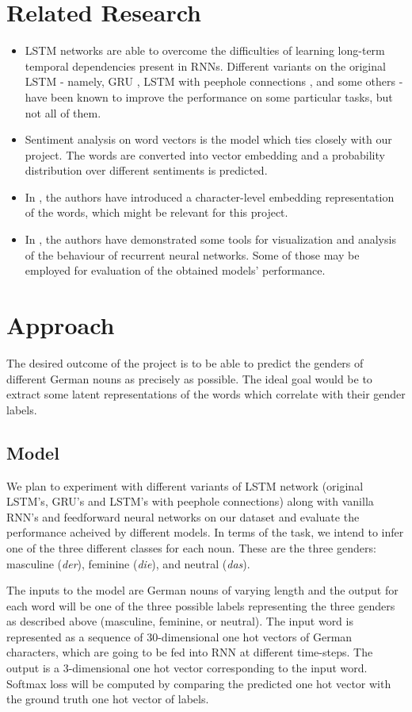 \documentclass[10pt,twocolumn,letterpaper]{article}
\begin{document}
\section{Related Research}
\begin{itemize}
    \item LSTM networks \cite{lstm} are able to overcome the difficulties of learning long-term temporal dependencies present in RNNs. Different variants on the original LSTM - namely, GRU \cite{gru}, LSTM with peephole connections \cite{peephole}, and some others - have been known to improve the performance on some particular tasks, but not all of them.
    \item Sentiment analysis on word vectors \cite{ng} is the model which ties closely with our project. The words are converted into vector embedding and a probability distribution over different sentiments is predicted.
    \item In \cite{santos}, the authors have introduced a character-level embedding representation of the words, which might be relevant for this project.
    \item In \cite{karpathy}, the authors have demonstrated some tools for visualization and analysis of the behaviour of recurrent neural networks. Some of those may be employed for evaluation of the obtained models' performance.
\end{itemize}

\section{Approach}
The desired outcome of the project is to be able to predict the genders of different German nouns as precisely as possible. The ideal goal would be to extract some latent representations of the words which correlate with their gender labels.\\

\subsection{Model}
We plan to experiment with different variants of LSTM network (original LSTM's, GRU's and LSTM's with peephole connections) along with vanilla RNN's and feedforward neural networks on our dataset and evaluate the performance acheived by different models. In terms of the task, we intend to infer one of the three different classes for each noun. These are the three genders: masculine (\textit{der}), feminine (\textit{die}), and neutral (\textit{das}).\par
The inputs to the model are German nouns of varying length and the output for each word will be one of the three possible labels representing the three genders as described above (masculine, feminine, or neutral). The input word is represented as a sequence of 30-dimensional one hot vectors of German characters, which are going to be fed into RNN at different time-steps. The output is a 3-dimensional one hot vector corresponding to the input word. Softmax loss will be computed by comparing the predicted one hot vector with the ground truth one hot vector of labels.
\end{document}
